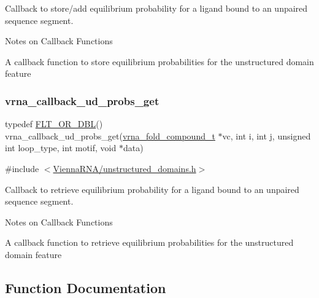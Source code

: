 Callback to store/add equilibrium probability for a ligand bound to an unpaired sequence segment. 

\begin{DoxyRefDesc}{Notes on Callback Functions}
\item[\mbox{\hyperlink{callbacks__callbacks000011}{Notes on Callback Functions}}]A callback function to store equilibrium probabilities for the unstructured domain feature \end{DoxyRefDesc}
\mbox{\label{group__domains__up_gaa10ba1b6f1e179ea84c5caca9cdaae67}} 
\subsubsection{\texorpdfstring{vrna\_callback\_ud\_probs\_get}{vrna\_callback\_ud\_probs\_get}}
{\footnotesize\ttfamily typedef \mbox{\hyperlink{group__data__structures_ga31125aeace516926bf7f251f759b6126}{F\+L\+T\+\_\+\+O\+R\+\_\+\+D\+BL}}() vrna\+\_\+callback\+\_\+ud\+\_\+probs\+\_\+get(\mbox{\hyperlink{group__fold__compound_ga1b0cef17fd40466cef5968eaeeff6166}{vrna\+\_\+fold\+\_\+compound\+\_\+t}} $\ast$vc, int i, int j, unsigned int loop\+\_\+type, int motif, void $\ast$data)}



{\ttfamily \#include $<$\mbox{\hyperlink{unstructured__domains_8h}{Vienna\+R\+N\+A/unstructured\+\_\+domains.\+h}}$>$}



Callback to retrieve equilibrium probability for a ligand bound to an unpaired sequence segment. 

\begin{DoxyRefDesc}{Notes on Callback Functions}
\item[\mbox{\hyperlink{callbacks__callbacks000012}{Notes on Callback Functions}}]A callback function to retrieve equilibrium probabilities for the unstructured domain feature \end{DoxyRefDesc}


\subsection{Function Documentation}
\mbox{\label{group__domains__up_ga2039caedf194c5edec794866986d95ec}} 
